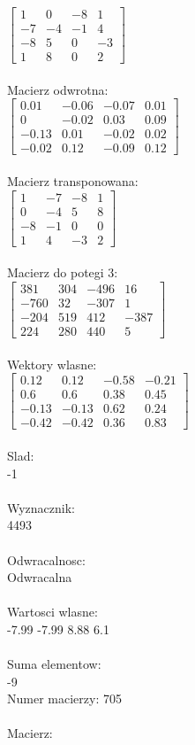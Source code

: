 \documentclass[a4paper,12pt]{article}
\begin{document}
$\begin{bmatrix} 1&0&-8&1\\-7&-4&-1&4\\-8&5&0&-3\\1&8&0&2 \end{bmatrix}$
\\
\\
Macierz odwrotna:\\

$\begin{bmatrix} 0.01&-0.06&-0.07&0.01\\0&-0.02&0.03&0.09\\-0.13&0.01&-0.02&0.02\\-0.02&0.12&-0.09&0.12 \end{bmatrix}$
\\
\\
Macierz transponowana:\\

$\begin{bmatrix} 1&-7&-8&1\\0&-4&5&8\\-8&-1&0&0\\1&4&-3&2 \end{bmatrix}$
\\
\\
Macierz do potegi 3:\\

$\begin{bmatrix} 381&304&-496&16\\-760&32&-307&1\\-204&519&412&-387\\224&280&440&5 \end{bmatrix}$
\\
\\
Wektory wlasne:\\

$\begin{bmatrix} 0.12&0.12&-0.58&-0.21\\0.6&0.6&0.38&0.45\\-0.13&-0.13&0.62&0.24\\-0.42&-0.42&0.36&0.83 \end{bmatrix}$
\\
\\
Slad:\\
-1
\\
\\
Wyznacznik:\\
4493
\\
\\
Odwracalnosc:\\
Odwracalna
\\
\\
Wartosci wlasne:\\
-7.99 -7.99 8.88 6.1
\\
\\
Suma elementow:\\
-9
\\
\newpage
Numer macierzy:
705
\\
\\
Macierz:\\
\end{document}
